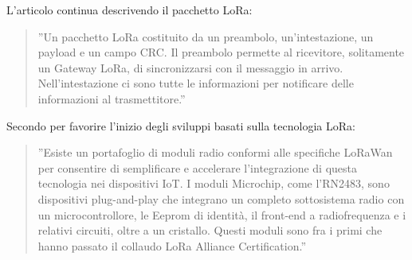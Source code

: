 \documentclass[a4paper]{report} %
\begin{document}
L'articolo continua descrivendo il pacchetto LoRa:
\begin{quote}
	''Un pacchetto LoRa costituito da un preambolo, un'intestazione, un payload e un campo CRC. Il preambolo permette al ricevitore, solitamente un Gateway LoRa, di sincronizzarsi con il messaggio in arrivo. Nell'intestazione ci sono tutte le informazioni per notificare delle informazioni al trasmettitore.''
\end{quote}


Secondo \cite{art:rif.20} per favorire l'inizio degli sviluppi basati sulla tecnologia LoRa:
\begin{quote}
	''Esiste un portafoglio di moduli radio conformi alle specifiche LoRaWan per consentire di semplificare e accelerare l'integrazione di questa tecnologia nei dispositivi IoT. I moduli Microchip, come l'RN2483, sono dispositivi plug-and-play che integrano un completo sottosistema radio con un microcontrollore, le Eeprom di identità, il front-end a radiofrequenza e i relativi circuiti, oltre a un cristallo. Questi moduli sono fra i primi che hanno passato il collaudo LoRa Alliance Certification.''
\end{quote}
\end{document}

